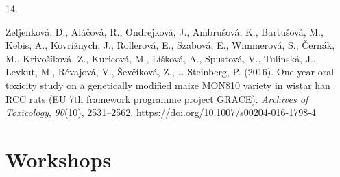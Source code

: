 \documentclass[11pt,a4paper,]{awesome-cv}
\newlength{\cslhangindent}
\newlength{\csllabelwidth}
\newenvironment{CSLReferences}[2] %
 {\begin{list}{}{%
  \setlength{\itemindent}{0pt}
  \setlength{\leftmargin}{0pt}
  \setlength{\parsep}{0pt}
  \ifodd #1
   \setlength{\leftmargin}{\cslhangindent}
   \setlength{\itemindent}{-1\cslhangindent}
  \fi
  \setlength{\itemsep}{#2\baselineskip}}}
 {\end{list}}
\newcommand{\CSLLeftMargin}[1]{\parbox[t]{\csllabelwidth}{\strut#1\strut}}
\newcommand{\CSLRightInline}[1]{\parbox[t]{\linewidth - \csllabelwidth}{\strut#1\strut}}
\begin{document}
\begin{CSLReferences}{0}{0}
\CSLLeftMargin{14. }%
\CSLRightInline{Zeljenková, D., Aláčová, R., Ondrejková, J., Ambrušová,
K., Bartušová, M., Kebis, A., Kovrižnych, J., Rollerová, E., Szabová,
E., Wimmerová, S., Černák, M., Krivošíková, Z., Kuricová, M., Líšková,
A., Spustová, V., Tulinská, J., Levkut, M., Révajová, V., Ševčíková, Z.,
\ldots{} Steinberg, P. (2016). One-year oral toxicity study on a
genetically modified maize MON810 variety in wistar han RCC rats (EU 7th
framework programme project GRACE). \emph{Archives of Toxicology},
\emph{90}(10), 2531--2562.
\url{https://doi.org/10.1007/s00204-016-1798-4}}

\end{CSLReferences}

\newpage

\section{Workshops}\label{workshops}
\end{document}
